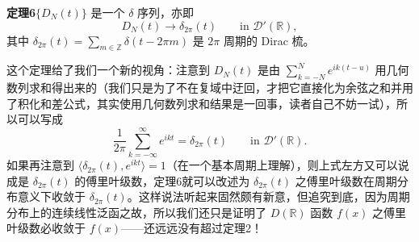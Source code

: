 \noindent\textbf{定理6}\quad $\{D_N(t)\}$ 是一个 $\delta$ 序列，亦即
\begin{equation}
 D_N(t)\longrightarrow \delta_{2\pi}(t)
 \qquad\text{in }\mathcal D'(\mathbb R),
 \tag{26}
\end{equation}
其中 $\delta_{2\pi}(t)=\sum_{m\in\mathbb Z}\delta(t-2\pi m)$ 是 $2\pi$ 周期的 Dirac 梳。

这个定理给了我们一个新的视角：注意到 $D_N(t)$ 是由 $\sum_{k=-N}^{N}e^{ik(t-u)}$ 用几何数列求和得出来的（我们只是为了不在复域中迂回，才把它直接化为余弦之和并用了积化和差公式，其实使用几何数列求和结果是一回事，读者自己不妨一试），所以可以写成
\[
 \frac1{2\pi}\sum_{k=-\infty}^{\infty}e^{ikt}=\delta_{2\pi}(t)
 \qquad\text{in }\mathcal D'(\mathbb R).
\]
如果再注意到 $\langle\delta_{2\pi}(t),e^{ikt}\rangle=1$（在一个基本周期上理解），则上式左方又可以说成是 $\delta_{2\pi}(t)$ 的傅里叶级数，定理6就可以改述为 $\delta_{2\pi}(t)$ 之傅里叶级数在周期分布意义下收敛于 $\delta_{2\pi}(t)$。这样说法听起来固然颇有新意，但追究到底，因为周期分布上的连续线性泛函之故，所以我们还只是证明了 $D(\mathbb R)$ 函数 $f(x)$ 之傅里叶级数必收敛于 $f(x)$——还远远没有超过定理2！

